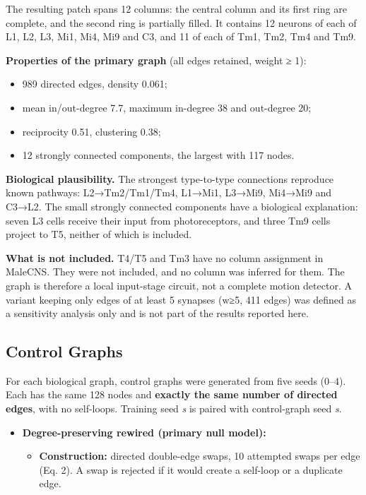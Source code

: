 The resulting patch spans 12 columns: the central column and its first ring are complete, and the second ring is partially filled. It contains 12 neurons of each of L1, L2, L3, Mi1, Mi4, Mi9 and C3, and 11 of each of Tm1, Tm2, Tm4 and Tm9.

\textbf{Properties of the primary graph} (all edges retained, weight ≥ 1):

\begin{itemize}
\item 989 directed edges, density 0.061;
\item mean in/out-degree 7.7, maximum in-degree 38 and out-degree 20;
\item reciprocity 0.51, clustering 0.38;
\item 12 strongly connected components, the largest with 117 nodes.
\end{itemize}

\textbf{Biological plausibility.} The strongest type-to-type connections reproduce known pathways: L2→Tm2/Tm1/Tm4, L1→Mi1, L3→Mi9, Mi4→Mi9 and C3→L2. The small strongly connected components have a biological explanation: seven L3 cells receive their input from photoreceptors, and three Tm9 cells project to T5, neither of which is included.

\textbf{What is not included.} T4/T5 and Tm3 have no column assignment in MaleCNS. They were not included, and no column was inferred for them. The graph is therefore a local input-stage circuit, not a complete motion detector. A variant keeping only edges of at least 5 synapses (w≥5, 411 edges) was defined as a sensitivity analysis only and is not part of the results reported here.

\subsection{Control Graphs}

For each biological graph, control graphs were generated from five seeds (0–4). Each has the same 128 nodes and \textbf{exactly the same number of directed edges}, with no self-loops. Training seed \emph{s} is paired with control-graph seed \emph{s}.

\begin{itemize}
\item \textbf{Degree-preserving rewired (primary null model):}
\begin{itemize}
\item \textbf{Construction:} directed double-edge swaps, 10 attempted swaps per edge (Eq. 2). A swap is rejected if it would create a self-loop or a duplicate edge.
\end{itemize}
\end{itemize}

